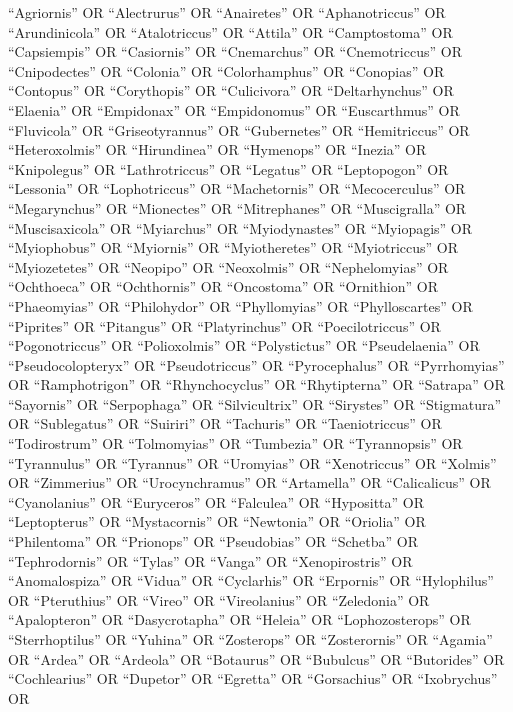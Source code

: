 \documentclass[
  number,
  review,
  onecolumn]{elsarticle}
\begin{document}
``Agriornis'' OR ``Alectrurus'' OR ``Anairetes'' OR ``Aphanotriccus'' OR
``Arundinicola'' OR ``Atalotriccus'' OR ``Attila'' OR ``Camptostoma'' OR
``Capsiempis'' OR ``Casiornis'' OR ``Cnemarchus'' OR ``Cnemotriccus'' OR
``Cnipodectes'' OR ``Colonia'' OR ``Colorhamphus'' OR ``Conopias'' OR
``Contopus'' OR ``Corythopis'' OR ``Culicivora'' OR ``Deltarhynchus'' OR
``Elaenia'' OR ``Empidonax'' OR ``Empidonomus'' OR ``Euscarthmus'' OR
``Fluvicola'' OR ``Griseotyrannus'' OR ``Gubernetes'' OR ``Hemitriccus''
OR ``Heteroxolmis'' OR ``Hirundinea'' OR ``Hymenops'' OR ``Inezia'' OR
``Knipolegus'' OR ``Lathrotriccus'' OR ``Legatus'' OR ``Leptopogon'' OR
``Lessonia'' OR ``Lophotriccus'' OR ``Machetornis'' OR ``Mecocerculus''
OR ``Megarynchus'' OR ``Mionectes'' OR ``Mitrephanes'' OR
``Muscigralla'' OR ``Muscisaxicola'' OR ``Myiarchus'' OR
``Myiodynastes'' OR ``Myiopagis'' OR ``Myiophobus'' OR ``Myiornis'' OR
``Myiotheretes'' OR ``Myiotriccus'' OR ``Myiozetetes'' OR ``Neopipo'' OR
``Neoxolmis'' OR ``Nephelomyias'' OR ``Ochthoeca'' OR ``Ochthornis'' OR
``Oncostoma'' OR ``Ornithion'' OR ``Phaeomyias'' OR ``Philohydor'' OR
``Phyllomyias'' OR ``Phylloscartes'' OR ``Piprites'' OR ``Pitangus'' OR
``Platyrinchus'' OR ``Poecilotriccus'' OR ``Pogonotriccus'' OR
``Polioxolmis'' OR ``Polystictus'' OR ``Pseudelaenia'' OR
``Pseudocolopteryx'' OR ``Pseudotriccus'' OR ``Pyrocephalus'' OR
``Pyrrhomyias'' OR ``Ramphotrigon'' OR ``Rhynchocyclus'' OR
``Rhytipterna'' OR ``Satrapa'' OR ``Sayornis'' OR ``Serpophaga'' OR
``Silvicultrix'' OR ``Sirystes'' OR ``Stigmatura'' OR ``Sublegatus'' OR
``Suiriri'' OR ``Tachuris'' OR ``Taeniotriccus'' OR ``Todirostrum'' OR
``Tolmomyias'' OR ``Tumbezia'' OR ``Tyrannopsis'' OR ``Tyrannulus'' OR
``Tyrannus'' OR ``Uromyias'' OR ``Xenotriccus'' OR ``Xolmis'' OR
``Zimmerius'' OR ``Urocynchramus'' OR ``Artamella'' OR ``Calicalicus''
OR ``Cyanolanius'' OR ``Euryceros'' OR ``Falculea'' OR ``Hypositta'' OR
``Leptopterus'' OR ``Mystacornis'' OR ``Newtonia'' OR ``Oriolia'' OR
``Philentoma'' OR ``Prionops'' OR ``Pseudobias'' OR ``Schetba'' OR
``Tephrodornis'' OR ``Tylas'' OR ``Vanga'' OR ``Xenopirostris'' OR
``Anomalospiza'' OR ``Vidua'' OR ``Cyclarhis'' OR ``Erpornis'' OR
``Hylophilus'' OR ``Pteruthius'' OR ``Vireo'' OR ``Vireolanius'' OR
``Zeledonia'' OR ``Apalopteron'' OR ``Dasycrotapha'' OR ``Heleia'' OR
``Lophozosterops'' OR ``Sterrhoptilus'' OR ``Yuhina'' OR ``Zosterops''
OR ``Zosterornis'' OR ``Agamia'' OR ``Ardea'' OR ``Ardeola'' OR
``Botaurus'' OR ``Bubulcus'' OR ``Butorides'' OR ``Cochlearius'' OR
``Dupetor'' OR ``Egretta'' OR ``Gorsachius'' OR ``Ixobrychus'' OR
\end{document}

